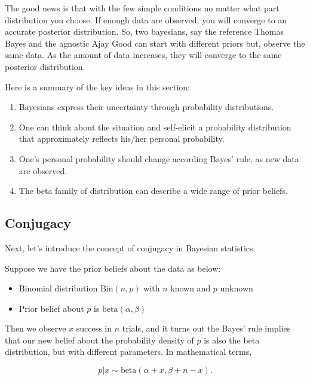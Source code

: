 \documentclass[]{book}
\theoremstyle{definition}
\theoremstyle{definition}
\theoremstyle{remark}
\begin{document}
The good news is that with the few simple conditions no matter what part
distribution you choose. If enough data are observed, you will converge
to an accurate posterior distribution. So, two bayesians, say the
reference Thomas Bayes and the agnostic Ajay Good can start with
different priors but, observe the same data. As the amount of data
increases, they will converge to the same posterior distribution.

Here is a summary of the key ideas in this section:

\begin{enumerate}
\def\labelenumi{\arabic{enumi}.}
\item
  Bayesians express their uncertainty through probability distributions.
\item
  One can think about the situation and self-elicit a probability
  distribution that approximately reflects his/her personal probability.
\item
  One's personal probability should change according Bayes' rule, as new
  data are observed.
\item
  The beta family of distribution can describe a wide range of prior
  beliefs.
\end{enumerate}

\subsection{Conjugacy}\label{conjugacy}

Next, let's introduce the concept of conjugacy in Bayesian statistics.

Suppose we have the prior beliefs about the data as below:

\begin{itemize}
\item
  Binomial distribution \(\text{Bin}(n,p)\) with \(n\) known and \(p\)
  unknown
\item
  Prior belief about \(p\) is \(\text{beta}(\alpha,\beta)\)
\end{itemize}

Then we observe \(x\) success in \(n\) trials, and it turns out the
Bayes' rule implies that our new belief about the probability density of
\(p\) is also the beta distribution, but with different parameters. In
mathematical terms,

\begin{equation}
p|x \sim \text{beta}(\alpha+x, \beta+n-x).
\label{eq:beta-binomial}
\end{equation}
\end{document}
